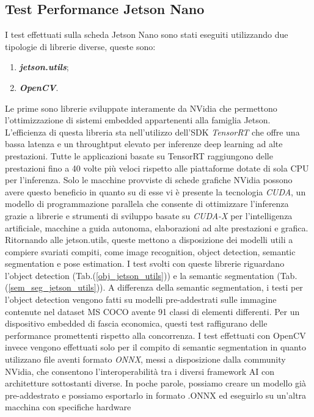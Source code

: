 \subsection{Test Performance Jetson Nano}
I test effettuati sulla scheda Jetson Nano sono stati eseguiti utilizzando due 
tipologie di librerie diverse, queste sono:
\begin{enumerate}
    \item {\bfseries{\emph{jetson.utils}}};
    \item {\bfseries{\emph{OpenCV}}}.
\end{enumerate}
Le prime sono librerie sviluppate interamente da NVidia che permettono 
l'ottimizzazione di sistemi embedded appartenenti alla famiglia Jetson. 
L'efficienza di questa libreria sta nell'utilizzo dell'SDK \emph{TensorRT} che offre 
una bassa latenza e un throughtput elevato per inferenze deep learning ad 
alte prestazioni. Tutte le applicazioni basate su TensorRT raggiungono 
delle prestazioni fino a 40 volte più veloci rispetto alle piattaforme dotate 
di sola CPU per l'inferenza. Solo le macchine provviste di schede grafiche 
NVidia possono avere questo beneficio in quanto su di esse vi è presente la 
tecnologia \emph{CUDA}, un modello di programmazione parallela che consente 
di ottimizzare l'inferenza grazie a librerie e strumenti di sviluppo basate 
su \emph{CUDA-X} per l'intelligenza artificiale, macchine a guida autonoma, 
elaborazioni ad alte prestazioni e grafica. Ritornando alle jetson.utils, 
queste mettono a disposizione dei modelli utili a compiere svariati compiti, 
come image recognition, object detection, semantic segmentation e pose estimation. 
I test svolti con queste librerie riguardano l'object detection (Tab.(\ref{obj_jetson_utils})) 
e la semantic segmentation (Tab.(\ref{sem_seg_jetson_utils})). A differenza della 
semantic segmentation, i testi per l'object detection vengono fatti su modelli 
pre-addestrati sulle immagine contenute nel dataset MS COCO avente 91 classi di 
elementi differenti. Per un dispositivo embedded di fascia economica, questi test 
raffigurano delle performance promettenti rispetto alla concorrenza.
I test effettuati con OpenCV invece vengono effettuati solo per il compito 
di semantic segmentation in quanto utilizzano file aventi formato \emph{ONNX}, 
messi a disposizione dalla community NVidia, che consentono l'interoperabilità 
tra i diversi framework AI con architetture sottostanti diverse. In poche 
parole, possiamo creare un modello già pre-addestrato e possiamo esportarlo 
in formato .ONNX ed eseguirlo su un'altra macchina con specifiche hardware 
